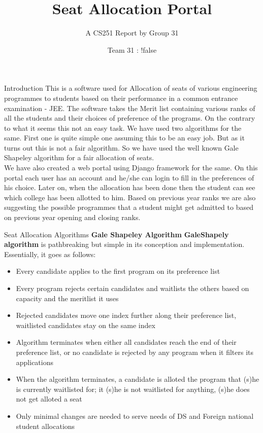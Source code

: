\documentclass{beamer}
\title[CS251 Project]{Seat Allocation Portal}
\subtitle{A CS251 Report by Group 31}
\date{Team 31 : !false}
\author[Prakash, Maloo \& Thakoor]
{%
  \texorpdfstring{
    \begin{columns}%
      \column{.25\linewidth}
      \centering
      Pradyot Prakash\\
      {130050008}\\
      \href{mailto:pp2105@gmail.com}{pp2105@gmail.com}
      \column{.35\linewidth}
      \centering
      Chandra Maloo\\
      {130050009}\\
      \href{mailto:maloochandra@gmail.com}{maloochandra@gmail.com}
      \column{.35\linewidth}
      \centering
      Shantanu Thakoor\\
      {130050008}\\
      \href{mailto:shanu.thakoor@gmail.com}{shanu.thakoor@gmail.com}
    \end{columns}
  }
  {Pradyot Prakash, Chandra Maloo \& Shantanu Thakoor}
}
\institute{IIT Bombay}
\begin{document}
\frame{\maketitle}

\begin{frame}[t]{Introduction}{}
  \pause
  This is a software used for Allocation of seats of various engineering programmes to students based on their performance in a common entrance examination - JEE.
  The software takes the Merit list containing various ranks of all the students and their choices of preference of the programs. On the contrary to what it seems this not an easy task. We have used two algorithms for the same. First one is quite simple one assuming this to be an easy job. But as it turns out this is not a fair algorithm. So we have used the well known Gale Shapeley algorithm for a fair allocation of seats. \\
  \pause
  We have also created a web portal using Django framework for the same. On this portal each user has an account and he/she can login to fill in the preferences of his choice. Later on, when the allocation has been done then the student can see which college has been allotted to him. Based on previous year ranks we are also suggesting the possible programmes that a student might get admitted to based on previous year opening and closing ranks.
 \vspace{1cm}
 \end{frame}

\begin{frame}[t]{Seat Allocation Algorithms}
\pause
\textbf{Gale Shapeley Algorithm}  
\textbf{GaleShapely algorithm} is pathbreaking but simple in its conception and implementation.
Essentially, it goes as follows:
 \pause
\begin{itemize}
\item Every candidate applies to the first program on its preference list
 \pause
\item Every program rejects certain candidates and waitlists the others based on capacity and the meritlist it uses
 \pause
\item Rejected candidates move one index further along their preference list, waitlisted candidates stay on the same index
 \pause
\item Algorithm terminates when either all candidates reach the end of their preference list, or no candidate is rejected by any program when it filters its
applications
 \pause
\item When the algorithm terminates, a candidate is alloted the program that (s)he is currently waitlisted for; it (s)he is not waitlisted for anything, (s)he does not get alloted a seat
 \pause
\item Only minimal changes are needed to serve needs of DS and Foreign national student allocations
\end{itemize}
\end{frame}
\end{document}
